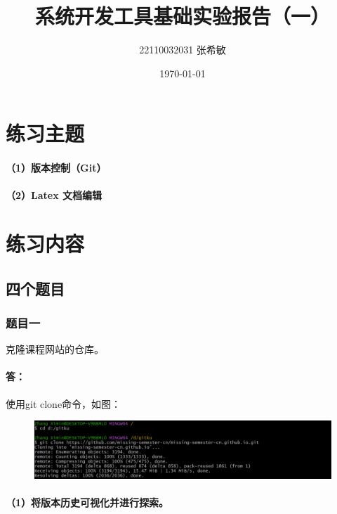 \documentclass[a4paper, 12pt]{article}
\begin{document}
	\title{系统开发工具基础实验报告（一）}
	\author{22110032031 张希敏}
	\date{\today}
	\maketitle
	
	\tableofcontents
	\newpage
	
	\section{练习主题}
	\paragraph{（1）版本控制（Git）}
	
	\paragraph{（2）Latex 文档编辑}
	
	\section{练习内容}
	
	\subsection{四个题目}
	
	\subsubsection{题目一}
	克隆课程网站的仓库。
	
	\paragraph{答：}
	使用git clone命令，如图：
	
	\begin{figure}[h]
		\centering
		\includegraphics[width=1\textwidth]{001.jpg}
	\end{figure}
	
	\paragraph{（1）将版本历史可视化并进行探索。}
	
\end{document}
